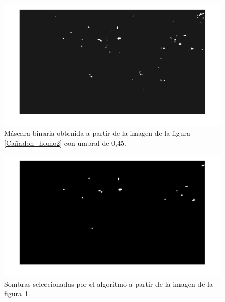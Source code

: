\begin{figure}[h!]
    \includegraphics[width=\textwidth]{Imagenes/Homomorfico/DJI_340_bin.png}
     \hfill
     \caption{Máscara binaria obtenida a partir de la imagen de la figura \ref{Cañadon_homo2} con umbral de 0,45.}
    \label{mascaraCañadon2}
\end{figure}

\begin{figure}[h!]
    \includegraphics[width=\textwidth]{Imagenes/Homomorfico/DJI_340_sel.png}
     \hfill
     \caption{Sombras seleccionadas por el algoritmo a partir de la imagen de la figura \ref{mascaraCañadon2}.}
    \label{seleccionadaCañadon2}
\end{figure}